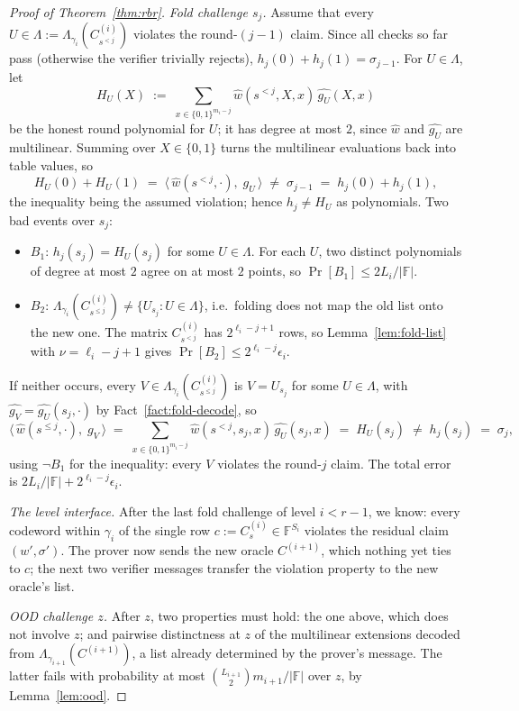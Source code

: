 \documentclass[11pt]{article}
\newcommand{\F}{\mathbb{F}}
\newcommand{\Lam}{\Lambda}
\newcommand{\cube}[1]{\{0,1\}^{#1}}
\newcommand{\pol}[1]{\widehat{#1}}
\theoremstyle{plain}
\theoremstyle{definition}
\theoremstyle{remark}
\begin{document}
\begin{proof}[Proof of Theorem~\ref{thm:rbr}]
\medskip\noindent\emph{Fold challenge $s_j$.}
Assume that every $U \in \Lam := \Lam_{\gamma_i}(C^{(i)}_{s^{<j}})$ violates the round-$(j{-}1)$ claim. Since all checks so far pass (otherwise the verifier trivially rejects), $h_j(0) + h_j(1) = \sigma_{j-1}$. For $U \in \Lam$, let
\[
H_U(X) \;:=\; \sum_{x \in \cube{m_i - j}} \pol{w}(s^{<j}, X, x)\, \pol{g_U}(X, x)
\]
be the honest round polynomial for $U$; it has degree at most $2$, since $\pol{w}$ and $\pol{g_U}$ are multilinear. Summing over $X \in \{0, 1\}$ turns the multilinear evaluations back into table values, so
\[
H_U(0) + H_U(1) \;=\; \bigl\langle\, \pol{w}(s^{<j}, \cdot),\; g_U \,\bigr\rangle \;\neq\; \sigma_{j-1} \;=\; h_j(0) + h_j(1),
\]
the inequality being the assumed violation; hence $h_j \neq H_U$ as polynomials. Two bad events over $s_j$:
\begin{itemize}[itemsep=1pt]
\item $B_1$: $h_j(s_j) = H_U(s_j)$ for some $U \in \Lam$. For each $U$, two distinct polynomials of degree at most $2$ agree on at most $2$ points, so $\Pr[B_1] \le 2 L_i / |\F|$.
\item $B_2$: $\Lam_{\gamma_i}(C^{(i)}_{s^{\le j}}) \neq \{ U_{s_j} : U \in \Lam \}$, i.e.\ folding does not map the old list onto the new one. The matrix $C^{(i)}_{s^{<j}}$ has $2^{\ell_i - j + 1}$ rows, so Lemma~\ref{lem:fold-list} with $\nu = \ell_i - j + 1$ gives $\Pr[B_2] \le 2^{\ell_i - j} \epsilon_i$.
\end{itemize}
If neither occurs, every $V \in \Lam_{\gamma_i}(C^{(i)}_{s^{\le j}})$ is $V = U_{s_j}$ for some $U \in \Lam$, with $\pol{g_V} = \pol{g_U}(s_j, \cdot)$ by Fact~\ref{fact:fold-decode}, so
\[
\bigl\langle\, \pol{w}(s^{\le j}, \cdot),\; g_V \,\bigr\rangle
\;=\; \sum_{x \in \cube{m_i - j}} \pol{w}(s^{<j}, s_j, x)\, \pol{g_U}(s_j, x)
\;=\; H_U(s_j) \;\neq\; h_j(s_j) \;=\; \sigma_j ,
\]
using $\neg B_1$ for the inequality: every $V$ violates the round-$j$ claim. The total error is $2 L_i/|\F| + 2^{\ell_i - j} \epsilon_i$.

\medskip\noindent\emph{The level interface.}
After the last fold challenge of level $i < r - 1$, we know: every codeword within $\gamma_i$ of the single row $c := C^{(i)}_s \in \F^{S_i}$ violates the residual claim $(w', \sigma')$. The prover now sends the new oracle $C^{(i+1)}$, which nothing yet ties to $c$; the next two verifier messages transfer the violation property to the new oracle's list.

\medskip\noindent\emph{OOD challenge $z$.}
After $z$, two properties must hold: the one above, which does not involve $z$; and pairwise distinctness at $z$ of the multilinear extensions decoded from $\Lam_{\gamma_{i+1}}(C^{(i+1)})$, a list already determined by the prover's message. The latter fails with probability at most $\binom{L_{i+1}}{2} m_{i+1} / |\F|$ over $z$, by Lemma~\ref{lem:ood}.


\end{proof}
\end{document}
